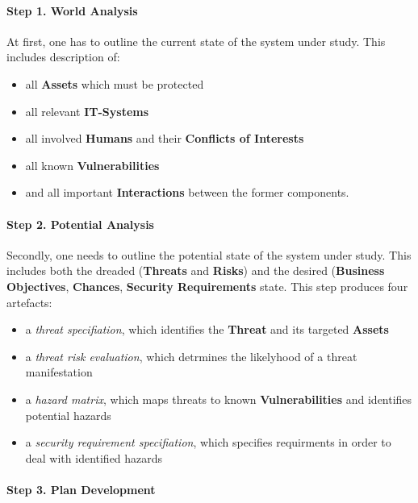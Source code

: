 \paragraph{Step 1. World Analysis}

At first, one has to outline the current state of the system under
study. This includes description of:

\begin{itemize}
\itemsep1pt\parskip0pt
\item
  all \textbf{Assets} which must be protected
\item
  all relevant \textbf{IT-Systems}
\item
  all involved \textbf{Humans} and their \textbf{Conflicts of Interests}
\item
  all known \textbf{Vulnerabilities}
\item
  and all important \textbf{Interactions} between the former components.
\end{itemize}

\paragraph{Step 2. Potential Analysis}

Secondly, one needs to outline the potential state of the system under
study. This includes both the dreaded (\textbf{Threats} and
\textbf{Risks}) and the desired (\textbf{Business Objectives},
\textbf{Chances}, \textbf{Security Requirements} state. This step
produces four artefacts:

\begin{itemize}
\itemsep1pt\parskip0pt
\item
  a \emph{threat specifiation}, which identifies the \textbf{Threat} and
  its targeted \textbf{Assets}
\item
  a \emph{threat risk evaluation}, which detrmines the likelyhood of a
  threat manifestation
\item
  a \emph{hazard matrix}, which maps threats to known
  \textbf{Vulnerabilities} and identifies potential hazards
\item
  a \emph{security requirement specifiation}, which specifies
  requirments in order to deal with identified hazards
\end{itemize}

\paragraph{Step 3. Plan Development}

